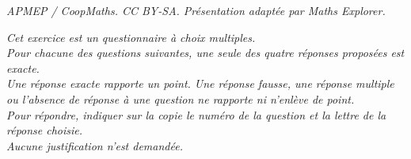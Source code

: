 \documentclass[10pt]{article}
\begin{document}
\noindent\textit{APMEP / CoopMaths. CC BY-SA. Présentation adaptée par Maths Explorer.}\par\medskip
\medskip

\emph{Cet exercice est un questionnaire à choix multiples.\\
Pour chacune des questions suivantes, une seule des quatre réponses proposées est exacte.\\ Une réponse exacte rapporte un point. Une réponse fausse, une réponse multiple ou l'absence de réponse à une question ne rapporte ni n'enlève de point.\\
Pour répondre, indiquer sur la copie le numéro de la question et la lettre de la réponse choisie.\\
Aucune justification n'est demandée.}

\medskip
\end{document}
